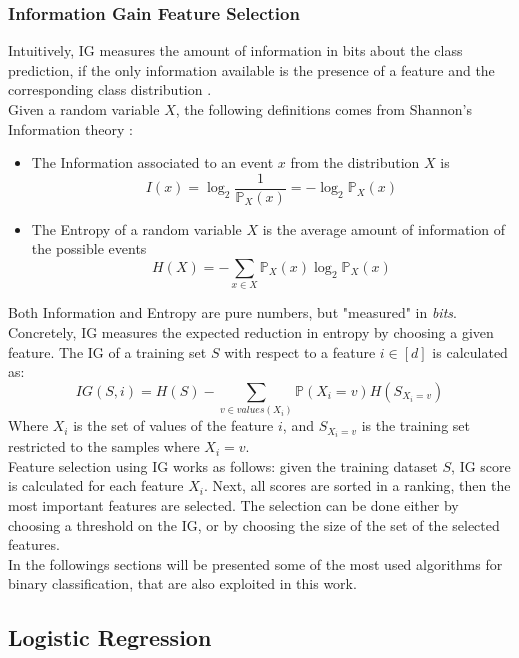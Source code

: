\subsubsection{Information Gain Feature Selection}

Intuitively, \ac{IG} measures the amount of information in bits about the class prediction, if the only information available is the presence of a feature and the corresponding class distribution \cite{Roobaert_chapter22}.\\
Given a random variable $X$, the following definitions comes from Shannon's Information theory \cite{Shannon1948}:
\begin{itemize}
	\item The Information associated to an event $x$ from the distribution $X$ is
	\[ I(x) = \log_2 \frac{1}{\mathbb{P}_X(x)} = - \log_2 \mathbb{P}_X(x) \]
	\item The Entropy of a random variable $X$ is the average amount of information of the possible events
	\[ H(X) = - \sum_{x \in X} \mathbb{P}_X(x) \log_2 \mathbb{P}_X(x) \]
\end{itemize}

Both Information and Entropy are pure numbers, but "measured" in \textit{bits}.\\
Concretely, \ac{IG} measures the expected reduction in entropy by choosing a given feature. The \ac{IG} of a training set $S$ with respect to a feature $i \in [d]$ is calculated as:
\[ IG(S, i) = H(S) - \sum_{v \in values(X_i)} \mathbb{P}(X_i = v) H(S_{X_i=v}) \]
Where $X_i$ is the set of values of the feature $i$, and $S_{X_i=v}$ is the training set restricted to the samples where $X_i=v$.\\
Feature selection using \ac{IG} works as follows: given the training dataset $S$, \ac{IG} score is calculated for each feature $X_i$. Next, all scores are sorted in a ranking, then the most important features are selected. The selection can be done either by choosing a threshold on the \ac{IG}, or by choosing the size of the set of the selected features.\\



In the followings sections will be presented some of the most used algorithms for binary classification, that are also exploited in this work.


\subsection{Logistic Regression}

